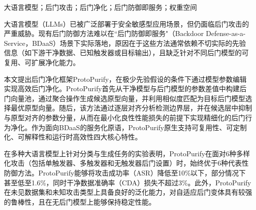 {}

\begin{cnabstract}{大语言模型；后门攻击；后门净化；后门防御即服务；权重空间}

大语言模型（LLMs）已被广泛部署于安全敏感型应用场景，但仍面临后门攻击的严重威胁。现有后门防御方法难以在``后门防御即服务"（Backdoor Defense-as-a-Service，BDaaS）场景下实际落地，原因在于这些方法通常依赖不切实际的先验信息（如下游干净数据、已知触发器或目标输出），且缺乏针对不同后门模型的可复用、可扩展净化能力。

本文提出后门净化框架ProtoPurify，在极少先验假设的条件下通过模型参数编辑实现高效后门净化。ProtoPurify首先从干净模型与后门模型的参数差值中构建后门向量池，通过聚合操作生成候选原型向量，并利用相似度匹配为目标后门模型选择最优原型向量。随后，该方法通过逐层对齐分析检测边界层，并在候选层中抑制与原型对齐的参数分量，从而在最小化良性性能损失的前提下实现精细化的后门行为净化。作为面向BDaaS的服务化原语，ProtoPurify原生支持可复用性、可定制化、可解释性和运行时高效性四大核心特性。

在多种大语言模型上针对分类与生成任务的实验表明，ProtoPurify在面对6种多样化攻击（包括单触发器、多触发器和无触发器后门设置）时，始终优于6种代表性防御方法。ProtoPurify能够将攻击成功率（ASR）降低至10\%以下，部分情况下甚至低至1.6\%，同时干净数据准确率（CDA）损失不超过3\%。此外，ProtoPurify在未见数据集和未知攻击类型上具备良好的泛化能力，对自适应后门变体具有较强的鲁棒性，且在无后门模型上能够保持稳定性能。

\end{cnabstract}
\newpage

{}

